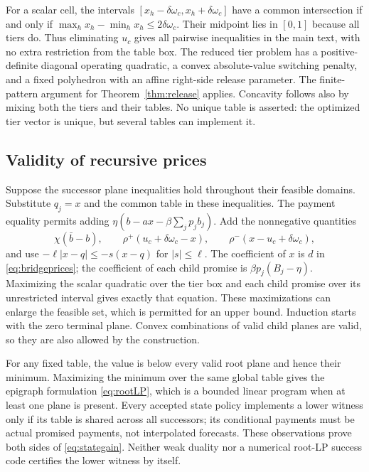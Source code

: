 For a scalar cell, the intervals $[x_h-\delta\omega_c,x_h+\delta\omega_c]$ have a common intersection if and only if $\max_hx_h-\min_hx_h\leq2\delta\omega_c$. Their midpoint lies in $[0,1]$ because all tiers do. Thus eliminating $u_c$ gives all pairwise inequalities in the main text, with no extra restriction from the table box. The reduced tier problem has a positive-definite diagonal operating quadratic, a convex absolute-value switching penalty, and a fixed polyhedron with an affine right-side release parameter. The finite-pattern argument for Theorem~\ref{thm:release} applies. Concavity follows also by mixing both the tiers and their tables. No unique table is asserted: the optimized tier vector is unique, but several tables can implement it.

\subsection{Validity of recursive prices}
Suppose the successor plane inequalities hold throughout their feasible domains. Substitute $q_j=x$ and the common table in these inequalities. The payment equality permits adding $\eta(b-ax-\beta\sum_jp_jb_j)$. Add the nonnegative quantities
\[
 \chi(\bar b-b),\qquad
 \rho^+(u_c+\delta\omega_c-x),\qquad
 \rho^-(x-u_c+\delta\omega_c),
\]
and use $-\ell|x-q|\leq-s(x-q)$ for $|s|\leq\ell$. The coefficient of $x$ is $d$ in \eqref{eq:bridgeprices}; the coefficient of each child promise is $\beta p_j(B_j-\eta)$. Maximizing the scalar quadratic over the tier box and each child promise over its unrestricted interval gives exactly that equation. These maximizations can enlarge the feasible set, which is permitted for an upper bound. Induction starts with the zero terminal plane. Convex combinations of valid child planes are valid, so they are also allowed by the construction.

For any fixed table, the value is below every valid root plane and hence their minimum. Maximizing the minimum over the same global table gives the epigraph formulation \eqref{eq:rootLP}, which is a bounded linear program when at least one plane is present. Every accepted state policy implements a lower witness only if its table is shared across all successors; its conditional payments must be actual promised payments, not interpolated forecasts. These observations prove both sides of \eqref{eq:stategain}. Neither weak duality nor a numerical root-LP success code certifies the lower witness by itself.

